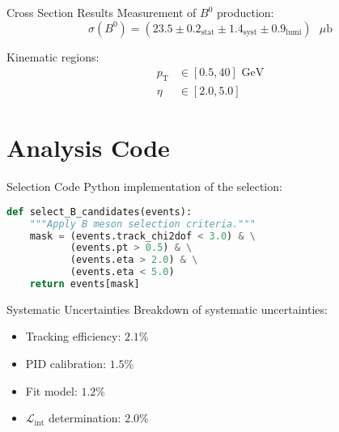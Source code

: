 \documentclass{me_beamer}
\begin{document}
\begin{frame}{Cross Section Results}
    Measurement of $B^0$ production:
    \[
        \sigma(B^0) = (23.5 \pm 0.2_{\text{stat}} \pm 1.4_{\text{syst}} \pm 0.9_{\text{lumi}})\text{ }\mu\text{b}
    \]
    
    \vspace{0.3cm}
    Kinematic regions:
    \begin{align*}
        p_{\text{T}} &\in [0.5, 40]\text{ GeV} \\
        \eta &\in [2.0, 5.0]
    \end{align*}
\end{frame}

\section{Analysis Code}

\begin{frame}[fragile]{Selection Code}
    Python implementation of the selection:
    \begin{lstlisting}[language=Python]
def select_B_candidates(events):
    """Apply B meson selection criteria."""
    mask = (events.track_chi2dof < 3.0) & \
           (events.pt > 0.5) & \
           (events.eta > 2.0) & \
           (events.eta < 5.0)
    return events[mask]
    \end{lstlisting}
\end{frame}

\backupbegin

\begin{frame}{Systematic Uncertainties}
    Breakdown of systematic uncertainties:
    \begin{itemize}
        \item Tracking efficiency: $2.1\%$
        \item PID calibration: $1.5\%$
        \item Fit model: $1.2\%$
        \item $\mathcal{L}_{\text{int}}$ determination: $2.0\%$
    \end{itemize}
\end{frame}

\backupend
\end{document}
